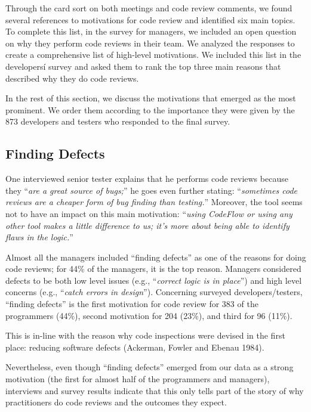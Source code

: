 \documentclass[conference]{IEEEtran}
\renewcommand{\quotation}[1]{``\emph{#1}''}
\begin{document}
Through the card sort on both meetings and code review comments, we found
several references to motivations for code review and identified six main
topics. To complete this list, in the survey for managers, we included an open
question on why they perform code reviews in their team. We analyzed the
responses to create a comprehensive list of high-level motivations. We included
this list in the developersí survey and asked them to rank the top three main
reasons that described why they do code reviews.

In the rest of this section, we discuss the motivations that emerged as the
most prominent. We order them according to the importance they were given by
the 873 developers and testers who responded to the final survey.

\subsection{Finding Defects}

One interviewed senior tester explains that he performs code reviews because
they \quotation{are a great source of bugs;} he goes even further stating:
\quotation{sometimes code reviews are a cheaper form of bug finding than
testing.} Moreover, the tool seems not to have an impact on this main
motivation: \quotation{using CodeFlow or using any other tool makes a little
difference to us; it's more about being able to identify flaws in the logic.}

Almost all the managers included ``finding defects'' as one of the reasons for
doing code reviews; for 44\% of the managers, it is the top reason. Managers
considered defects to be both low level issues (e.g., \quotation{correct logic
is in place}) and high level concerns (e.g., \quotation{catch errors in
design}). Concerning surveyed developers/testers, ``finding defects'' is the
first motivation for code review for 383 of the programmers (44\%), second
motivation for 204 (23\%), and third for 96 (11\%).

This is in-line with the reason why code inspections were devised in the first
place: reducing software defects (Ackerman, Fowler and Ebenau 1984).

Nevertheless, even though ``finding defects'' emerged from our data as a strong
motivation (the first for almost half of the programmers and managers),
interviews and survey results indicate that this only tells part of the story
of why practitioners do code reviews and the outcomes they expect.
\end{document}
